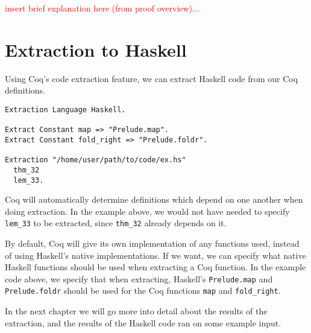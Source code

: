 \textcolor{red}{insert brief explanation here (from proof overview)...}

\section{Extraction to Haskell}

Using Coq's code extraction feature, we can extract Haskell code from our Coq definitions.

\begin{minipage}{\linewidth}
\begin{lstlisting}[language=Coq, label={lst:extraction}, caption={Extraction of Coq definitions to Haskell}]
Extraction Language Haskell.

Extract Constant map => "Prelude.map".
Extract Constant fold_right => "Prelude.foldr".

Extraction "/home/user/path/to/code/ex.hs"
  thm_32
  lem_33.
\end{lstlisting}
\end{minipage}

Coq will automatically determine definitions which depend on one another when doing extraction.
In the example above, we would not have needed to specify \lstinline{lem_33} to be extracted,
since \lstinline{thm_32} already depends on it.

By default, Coq will give its own implementation of any functions used, instead of using
Haskell's native implementations. If we want, we can specify what native Haskell functions
should be used when extracting a Coq function. In the example code above,
we specify that when extracting, Haskell's \lstinline[language=Haskell]{Prelude.map} and \lstinline[language=Haskell]{Prelude.foldr}
should be used for the Coq functions \lstinline{map} and \lstinline{fold_right}.

In the next chapter we will go more into detail about the results of the extraction,
and the results of the Haskell code ran on some example input.
